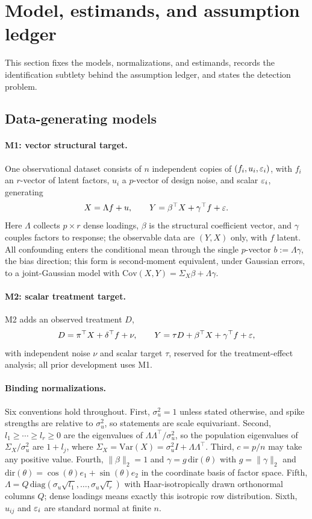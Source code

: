 \section{Model, estimands, and assumption ledger}
\label{sec:model}

This section fixes the models, normalizations, and estimands, records the identification subtlety behind the assumption ledger, and states the detection problem.

\subsection{Data-generating models}
\label{subsec:dgm}

\paragraph{M1: vector structural target.}
One observational dataset consists of $n$ independent copies of $(f_i, u_i, \varepsilon_i)$, with $f_i$ an $r$-vector of latent factors, $u_i$ a $p$-vector of design noise, and scalar $\varepsilon_i$, generating
\[
X = \Lambda f + u, \qquad Y = \beta^\top X + \gamma^\top f + \varepsilon .
\]
Here $\Lambda$ collects $p \times r$ dense loadings, $\beta$ is the structural coefficient vector, and $\gamma$ couples factors to response; the observable data are $(Y, X)$ only, with $f$ latent. All confounding enters the conditional mean through the single $p$-vector $b := \Lambda\gamma$, the bias direction; this form is second-moment equivalent, under Gaussian errors, to a joint-Gaussian model with $\mathrm{Cov}(X,Y) = \Sigma_X\beta + \Lambda\gamma$.

\paragraph{M2: scalar treatment target.}
M2 adds an observed treatment $D$,
\[
D = \pi^\top X + \delta^\top f + \nu, \qquad Y = \tau D + \beta^\top X + \gamma^\top f + \varepsilon ,
\]
with independent noise $\nu$ and scalar target $\tau$, reserved for the treatment-effect analysis; all prior development uses M1.

\paragraph{Binding normalizations.}
Six conventions hold throughout. First, $\sigma_u^2 = 1$ unless stated otherwise, and spike strengths are relative to $\sigma_u^2$, so statements are scale equivariant. Second, $l_1 \ge \cdots \ge l_r \ge 0$ are the eigenvalues of $\Lambda\Lambda^\top/\sigma_u^2$, so the population eigenvalues of $\Sigma_X/\sigma_u^2$ are $1 + l_j$, where $\Sigma_X = \mathrm{Var}(X) = \sigma_u^2 I + \Lambda\Lambda^\top$. Third, $c = p/n$ may take any positive value. Fourth, $\|\beta\|_2 = 1$ and $\gamma = g\,\mathrm{dir}(\theta)$ with $g = \|\gamma\|_2$ and $\mathrm{dir}(\theta) = \cos(\theta)e_1 + \sin(\theta)e_2$ in the coordinate basis of factor space. Fifth, $\Lambda = Q\,\mathrm{diag}(\sigma_u\sqrt{l_1}, \dots, \sigma_u\sqrt{l_r})$ with Haar-isotropically drawn orthonormal columns $Q$; dense loadings means exactly this isotropic row distribution. Sixth, $u_{ij}$ and $\varepsilon_i$ are standard normal at finite $n$.

